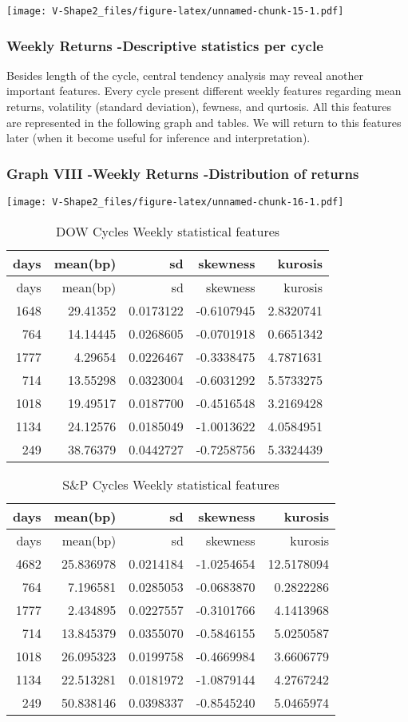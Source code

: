 \documentclass[
]{article}
\begin{document}
\texttt{[image: V-Shape2\_files/figure-latex/unnamed-chunk-15-1.pdf]}

\hypertarget{weekly-returns--descriptive-statistics-per-cycle}{%
\subsubsection{Weekly Returns -Descriptive statistics per
cycle}\label{weekly-returns--descriptive-statistics-per-cycle}}

Besides length of the cycle, central tendency analysis may reveal
another important features. Every cycle present different weekly
features regarding mean returns, volatility (standard deviation),
fewness, and qurtosis. All this features are represented in the
following graph and tables. We will return to this features later (when
it become useful for inference and interpretation).

\hypertarget{graph-viii--weekly-returns--distribution-of-returns}{%
\subsubsection{Graph VIII -Weekly Returns -Distribution of
returns}\label{graph-viii--weekly-returns--distribution-of-returns}}

\texttt{[image: V-Shape2\_files/figure-latex/unnamed-chunk-16-1.pdf]}

\begin{longtable}[]{@{}rrrrr@{}}
\caption{DOW Cycles Weekly statistical features}\tabularnewline
\toprule
days & mean(bp) & sd & skewness & kurosis\tabularnewline
\midrule
\endfirsthead
\toprule
days & mean(bp) & sd & skewness & kurosis\tabularnewline
\midrule
\endhead
1648 & 29.41352 & 0.0173122 & -0.6107945 & 2.8320741\tabularnewline
764 & 14.14445 & 0.0268605 & -0.0701918 & 0.6651342\tabularnewline
1777 & 4.29654 & 0.0226467 & -0.3338475 & 4.7871631\tabularnewline
714 & 13.55298 & 0.0323004 & -0.6031292 & 5.5733275\tabularnewline
1018 & 19.49517 & 0.0187700 & -0.4516548 & 3.2169428\tabularnewline
1134 & 24.12576 & 0.0185049 & -1.0013622 & 4.0584951\tabularnewline
249 & 38.76379 & 0.0442727 & -0.7258756 & 5.3324439\tabularnewline
\bottomrule
\end{longtable}

\begin{longtable}[]{@{}rrrrr@{}}
\caption{S\&P Cycles Weekly statistical features}\tabularnewline
\toprule
days & mean(bp) & sd & skewness & kurosis\tabularnewline
\midrule
\endfirsthead
\toprule
days & mean(bp) & sd & skewness & kurosis\tabularnewline
\midrule
\endhead
4682 & 25.836978 & 0.0214184 & -1.0254654 & 12.5178094\tabularnewline
764 & 7.196581 & 0.0285053 & -0.0683870 & 0.2822286\tabularnewline
1777 & 2.434895 & 0.0227557 & -0.3101766 & 4.1413968\tabularnewline
714 & 13.845379 & 0.0355070 & -0.5846155 & 5.0250587\tabularnewline
1018 & 26.095323 & 0.0199758 & -0.4669984 & 3.6606779\tabularnewline
1134 & 22.513281 & 0.0181972 & -1.0879144 & 4.2767242\tabularnewline
249 & 50.838146 & 0.0398337 & -0.8545240 & 5.0465974\tabularnewline
\bottomrule
\end{longtable}
\end{document}
